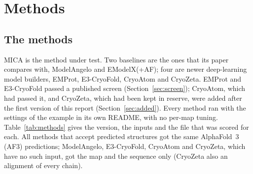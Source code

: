 \section{Methods}\label{sec:methods}

\subsection{The \NMethodsWord{} methods}
MICA is the method under test. Two baselines are the ones that its paper compares with, ModelAngelo and EModelX(+AF); four are newer deep-learning model builders, EMProt, E3-CryoFold, CryoAtom and CryoZeta. EMProt and E3-CryoFold passed a published screen (Section~\ref{sec:screen}); CryoAtom, which had passed it, and CryoZeta, which had been kept in reserve, were added after the first version of this report (Section~\ref{sec:added}). Every method ran with the settings of the example in its own README, with no per-map tuning. Table~\ref{tab:methods} gives the version, the inputs and the file that was scored for each. All methods that accept predicted structures got the same AlphaFold~3 (AF3) predictions; ModelAngelo, E3-CryoFold, CryoAtom and CryoZeta, which have no such input, got the map and the sequence only (CryoZeta also an alignment of every chain).

